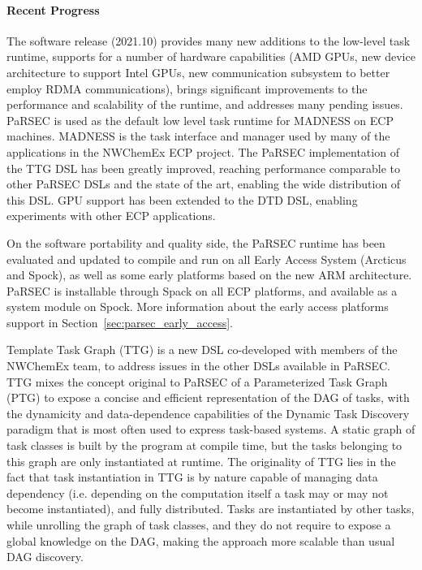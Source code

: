 %
%


\paragraph{Recent Progress}

The software release (2021.10) provides many new additions to the low-level task
runtime, supports for a number of hardware capabilities (AMD GPUs, new device
architecture to support Intel GPUs, new communication subsystem to better
employ RDMA communications), brings significant improvements to the performance
and scalability of the runtime, and addresses many pending issues. PaRSEC
is used as the default low level task runtime for MADNESS on ECP machines.
MADNESS is the task interface and manager used by many of the applications
in the NWChemEx ECP project. The PaRSEC implementation of the TTG DSL has
been greatly improved, reaching performance comparable to other PaRSEC DSLs
and the state of the art, enabling the wide distribution of this DSL. GPU
support has been extended to the DTD DSL, enabling experiments with other
ECP applications.

%
%
On the software portability and quality side, the PaRSEC runtime has been evaluated
and updated to compile and run on all Early Access System (Arcticus
and Spock), as well as some early platforms based on the new ARM
architecture.  PaRSEC is installable through Spack on all ECP platforms,
and available as a system module on Spock. More information about the early
access platforms support in Section~\ref{sec:parsec_early_access}.

%
%
Template Task Graph (TTG) is a new DSL co-developed with members of
the NWChemEx team, to address issues in the other DSLs available in
PaRSEC. TTG mixes the concept original to PaRSEC of a Parameterized
Task Graph (PTG) to expose a concise and efficient representation of
the DAG of tasks, with the dynamicity and data-dependence capabilities
of the Dynamic Task Discovery paradigm that is most often used to
express task-based systems. A static graph of task classes is built
by the program at compile time, but the tasks belonging to this graph
are only instantiated at runtime. The originality of TTG lies
in the fact that task instantiation in TTG is by nature capable of
managing data dependency (i.e. depending on the computation itself a
task may or may not become instantiated), and fully distributed.
Tasks are instantiated by other tasks, while unrolling the graph of
task classes, and they do not require to expose a global knowledge on
the DAG, making the approach more scalable than usual DAG discovery.

